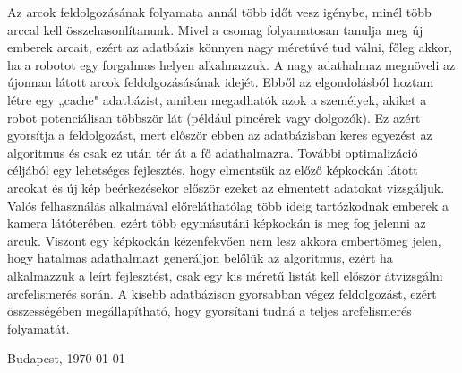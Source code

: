 Az arcok feldolgozásának folyamata annál több időt vesz igénybe, minél több arccal kell összehasonlítanunk. Mivel a csomag folyamatosan tanulja meg új emberek arcait, ezért az adatbázis könnyen nagy méretűvé tud válni, főleg akkor, ha a robotot egy forgalmas helyen alkalmazzuk. A nagy adathalmaz megnöveli az újonnan látott arcok feldolgozásásának idejét. Ebből az elgondolásból hoztam létre egy „cache" adatbázist, amiben megadhatók azok a személyek, akiket a robot potenciálisan többször lát (például pincérek vagy dolgozók). Ez azért gyorsítja a feldolgozást, mert először ebben az adatbázisban keres egyezést az algoritmus és csak ez után tér át a fő adathalmazra. További optimalizáció céljából egy lehetséges fejlesztés, hogy elmentsük az előző képkockán látott arcokat és új kép beérkezésekor először ezeket az elmentett adatokat vizsgáljuk. Valós felhasználás alkalmával előreláthatólag több ideig tartózkodnak emberek a kamera látóterében, ezért több egymásutáni képkockán is meg fog jelenni az arcuk. Viszont egy képkockán kézenfekvően nem lesz akkora embertömeg jelen, hogy hatalmas adathalmazt generáljon belőlük az algoritmus, ezért ha alkalmazzuk a leírt fejlesztést, csak egy kis méretű listát kell először átvizsgálni arcfelismerés során. A kisebb adatbázison gyorsabban végez feldolgozást, ezért összességében megállapítható, hogy gyorsítani tudná a teljes arcfelismerés folyamatát.

\vspace{0.5cm}

\begin{flushleft}
{Budapest, \today}
\end{flushleft}

\begin{flushright}
\emph{\authorName}
\end{flushright}

\vfill

